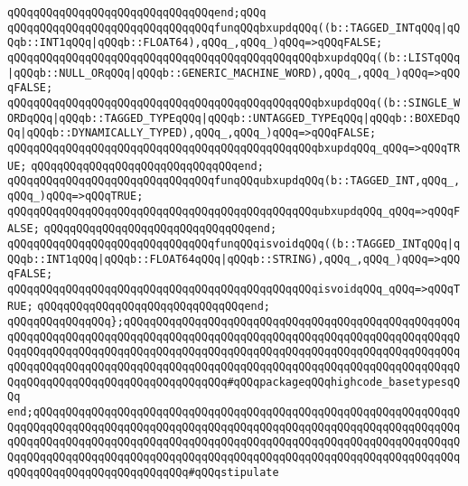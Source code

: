 \verb|qQQqqQQqqQQqqQQqqQQqqQQqqQQqqQQqend;qQQq|\newline
\newline
\verb|qQQqqQQqqQQqqQQqqQQqqQQqqQQqqQQqfunqQQqbxupdqQQq((b::TAGGED_INTqQQq|\verb#|qQQqb::INT1qQQq|qQQqb::FLOAT64),qQQq_,qQQq_)qQQq=>qQQqFALSE;#\newline
\verb|qQQqqQQqqQQqqQQqqQQqqQQqqQQqqQQqqQQqqQQqqQQqqQQqbxupdqQQq((b::LISTqQQq|\verb#|qQQqb::NULL_ORqQQq|qQQqb::GENERIC_MACHINE_WORD),qQQq_,qQQq_)qQQq=>qQQqFALSE;#\newline
\verb|qQQqqQQqqQQqqQQqqQQqqQQqqQQqqQQqqQQqqQQqqQQqqQQqbxupdqQQq((b::SINGLE_WORDqQQq|\verb#|qQQqb::TAGGED_TYPEqQQq|qQQqb::UNTAGGED_TYPEqQQq|qQQqb::BOXEDqQQq|qQQqb::DYNAMICALLY_TYPED),qQQq_,qQQq_)qQQq=>qQQqFALSE;#\newline
\verb|qQQqqQQqqQQqqQQqqQQqqQQqqQQqqQQqqQQqqQQqqQQqqQQqbxupdqQQq_qQQq=>qQQqTRUE;|\newline
\verb|qQQqqQQqqQQqqQQqqQQqqQQqqQQqqQQqend;|\newline
\newline
\verb|qQQqqQQqqQQqqQQqqQQqqQQqqQQqqQQqfunqQQqubxupdqQQq(b::TAGGED_INT,qQQq_,qQQq_)qQQq=>qQQqTRUE;|\newline
\verb|qQQqqQQqqQQqqQQqqQQqqQQqqQQqqQQqqQQqqQQqqQQqqQQqubxupdqQQq_qQQq=>qQQqFALSE;|\newline
\verb|qQQqqQQqqQQqqQQqqQQqqQQqqQQqqQQqend;|\newline
\newline
\verb|qQQqqQQqqQQqqQQqqQQqqQQqqQQqqQQqfunqQQqisvoidqQQq((b::TAGGED_INTqQQq|\verb#|qQQqb::INT1qQQq|qQQqb::FLOAT64qQQq|qQQqb::STRING),qQQq_,qQQq_)qQQq=>qQQqFALSE;#\newline
\verb|qQQqqQQqqQQqqQQqqQQqqQQqqQQqqQQqqQQqqQQqqQQqqQQqisvoidqQQq_qQQq=>qQQqTRUE;|\newline
\verb|qQQqqQQqqQQqqQQqqQQqqQQqqQQqqQQqend;|\newline
\newline
\verb|qQQqqQQqqQQqqQQq};qQQqqQQqqQQqqQQqqQQqqQQqqQQqqQQqqQQqqQQqqQQqqQQqqQQqqQQqqQQqqQQqqQQqqQQqqQQqqQQqqQQqqQQqqQQqqQQqqQQqqQQqqQQqqQQqqQQqqQQqqQQqqQQqqQQqqQQqqQQqqQQqqQQqqQQqqQQqqQQqqQQqqQQqqQQqqQQqqQQqqQQqqQQqqQQqqQQqqQQqqQQqqQQqqQQqqQQqqQQqqQQqqQQqqQQqqQQqqQQqqQQqqQQqqQQqqQQqqQQqqQQqqQQqqQQqqQQqqQQqqQQqqQQqqQQqqQQq#qQQqpackageqQQqhighcode_basetypesqQQq|\newline
\verb|end;qQQqqQQqqQQqqQQqqQQqqQQqqQQqqQQqqQQqqQQqqQQqqQQqqQQqqQQqqQQqqQQqqQQqqQQqqQQqqQQqqQQqqQQqqQQqqQQqqQQqqQQqqQQqqQQqqQQqqQQqqQQqqQQqqQQqqQQqqQQqqQQqqQQqqQQqqQQqqQQqqQQqqQQqqQQqqQQqqQQqqQQqqQQqqQQqqQQqqQQqqQQqqQQqqQQqqQQqqQQqqQQqqQQqqQQqqQQqqQQqqQQqqQQqqQQqqQQqqQQqqQQqqQQqqQQqqQQqqQQqqQQqqQQqqQQqqQQqqQQqqQQq#qQQqstipulate|\newline
\newline

